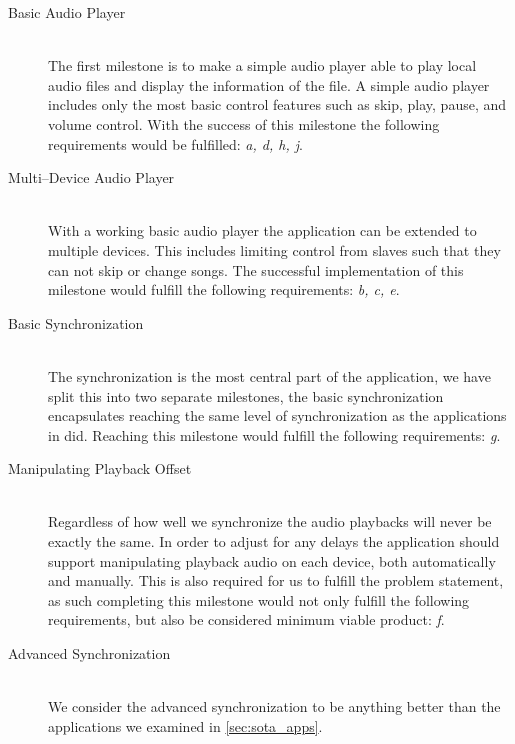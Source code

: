 \begin{description}
    \item [Basic Audio Player] \hfill \\
        The first milestone is to make a simple audio player able to play local audio files and display the information of the file.
        A simple audio player includes only the most basic control features such as skip, play, pause, and volume control.
        With the success of this milestone the following requirements would be fulfilled: \textit{a, d, h, j}.
    \item [Multi--Device Audio Player] \hfill \\
        With a working basic audio player the application can be extended to multiple devices.
        This includes limiting control from slaves such that they can not skip or change songs.
        The successful implementation of this milestone would fulfill the following requirements: \textit{b, c, e}.
    \item [Basic Synchronization] \hfill \\
        The synchronization is the most central part of the application, we have split this into two separate milestones, the basic synchronization encapsulates reaching the same level of synchronization as the applications in  did.
        Reaching this milestone would fulfill the following requirements: \textit{g}.
    \item [Manipulating Playback Offset] \hfill \\ %
        Regardless of how well we synchronize the audio playbacks will never be exactly the same.
        In order to adjust for any delays the application should support manipulating playback audio on each device, both automatically and manually.
        This is also required for us to fulfill the problem statement, as such completing this milestone would not only fulfill the following requirements, but also be considered minimum viable product: \textit{f}.
    \item [Advanced Synchronization] \hfill \\
        We consider the advanced synchronization to be anything better than the applications we examined in \cref{sec:sota_apps}.

\end{description}
